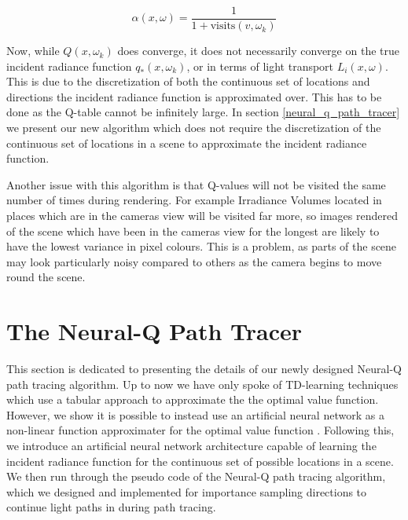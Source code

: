 \documentclass[../dissertation.tex]{subfiles}
\begin{document}
\begin{equation}
\label{eq:decay_lr}
\alpha(x, \omega) = \frac{1}{1 + \text{visits}(v, \omega_k)}
\end{equation}

Now, while $Q(x, \omega_k)$ does converge, it does not necessarily converge on the true incident radiance function $q_*(x, \omega_k)$, or in terms of light transport $L_i(x, \omega)$. This is due to the discretization of both the continuous set of locations and directions the incident radiance function is approximated over. This has to be done as the Q-table cannot be infinitely large. In section \ref{neural_q_path_tracer} we present our new algorithm which does not  require the discretization of the continuous set of locations in a scene to approximate the incident radiance function.

Another issue with this algorithm is that  Q-values will not be visited the same number of times during rendering. For example Irradiance Volumes located in places which are in the cameras view will be visited far more, so images rendered of the scene which have been in the cameras view for the longest are likely to have the lowest variance in pixel colours. This is a problem, as parts of the scene may look particularly noisy compared to others as the camera begins to move round the scene.

\pagebreak


\section{The Neural-Q Path Tracer}
\label{sec:neural_q_path_tracer}

This section is dedicated to presenting the details of our newly designed Neural-Q path tracing algorithm. Up to now we have only spoke of TD-learning techniques which use a tabular approach to approximate the the optimal value function. However, we show it is possible to instead use an artificial neural network as a non-linear function approximater for the optimal value function \cite{deep_rl_function_approx}. Following this, we introduce an artificial neural network architecture capable of learning the incident radiance function for the continuous set of possible locations in a scene. We then run through the pseudo code of the Neural-Q path tracing algorithm, which we designed and implemented for importance sampling directions to continue light paths in during path tracing.
\end{document}
